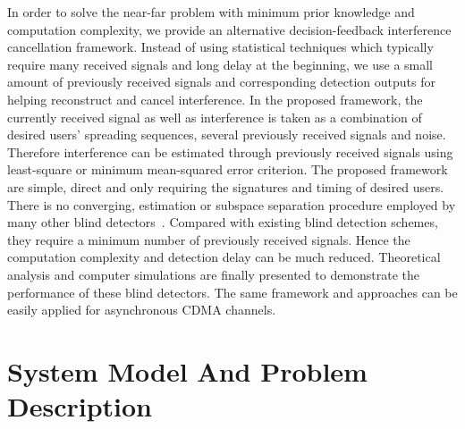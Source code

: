 \documentclass[a4paper,10pt,fleqn, twocolumn]{IEEETran}
\begin{document}
In order to solve the near-far problem with minimum prior
knowledge and computation complexity, we provide an alternative
decision-feedback interference cancellation framework. Instead of
using statistical techniques which typically require many received
signals and long delay at the beginning, we use a small amount of
previously received signals and corresponding detection outputs
for helping reconstruct and cancel interference. In the proposed
framework, the currently received signal as well as interference
is taken as a combination of desired users' spreading sequences,
several previously received signals and noise. Therefore
interference can be estimated through previously received signals
using least-square or minimum mean-squared error criterion. The
proposed framework are simple, direct and only requiring the
signatures and timing of desired users. There is no converging,
estimation or subspace separation procedure employed by many other
blind detectors~\cite{Madh94,Honi95,Wang98,Wang99}. Compared with
existing blind detection schemes, they require a minimum number of
previously received signals. Hence the computation complexity and
detection delay can be much reduced. Theoretical analysis and
computer simulations are finally presented to demonstrate the
performance of these blind detectors. The same framework and
approaches can be easily applied for asynchronous CDMA channels.
\section{System Model And Problem Description}
\end{document}
